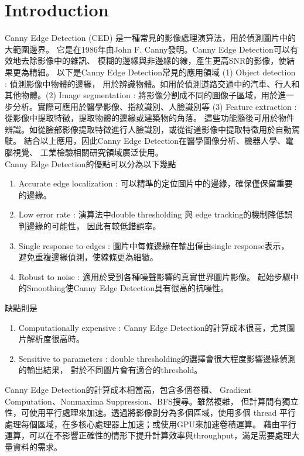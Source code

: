 \documentclass[sigconf,nonacm]{acmart}
\begin{document}
\section{Introduction}
  Canny Edge Detection (CED) 是一種常見的影像處理演算法，用於偵測圖片中的大範圍邊界。
  它是在1986年由John F. Canny發明。Canny Edge Detection可以有效地去除影像中的雜訊、
  模糊的邊緣與非邊緣的線，產生更高SNR的影像，使結果更為精細。
  以下是Canny Edge Detection常見的應用領域 (1) Object detection : 偵測影像中物體的邊緣，
  用於辨識物體。如用於偵測道路交通中的汽車、行人和其他物體。(2) Image segmentation : 
  將影像分割成不同的圖像子區域，用於進一步分析。實際可應用於醫學影像、指紋識別、人臉識別等 
  (3) Feature extraction : 從影像中提取特徵，提取物體的邊緣或建築物的角落。
  這些功能隨後可用於物件辨識。如從臉部影像提取特徵進行人臉識別，或從街道影像中提取特徵用於自動駕駛。
  結合以上應用，因此Canny Edge Detection在醫學圖像分析、機器人學、電腦視覺、
  工業檢驗相關研究領域廣泛使用。 \\
  Canny Edge Detection的優點可以分為以下幾點
  \begin{enumerate}
    \item Accurate edge localization : 可以精準的定位圖片中的邊緣，確保僅保留重要的邊緣。
    \item Low error rate : 演算法中double thresholding 與 edge tracking的機制降低誤判邊緣的可能性，
    因此有較低錯誤率。
    \item Single response to edges : 圖片中每條邊緣在輸出僅由single response表示，
    避免重複邊緣偵測，使線條更為細緻。
    \item Robust to noise : 適用於受到各種噪聲影響的真實世界圖片影像。
    起始步驟中的Smoothing使Canny Edge Detection具有很高的抗噪性。
  \end{enumerate}
  缺點則是
  \begin{enumerate}
    \item Computationally expensive : Canny Edge Detection的計算成本很高，尤其圖片解析度很高時。
    \item Sensitive to parameters : double thresholding的選擇會很大程度影響邊緣偵測的輸出結果，
    對於不同圖片會有適合的threshold。
  \end{enumerate}
  Canny Edge Detection的計算成本相當高，包含多個卷積、
  Gradient Computation、Nonmaxima Suppression、BFS搜尋。雖然複雜，
  但計算間有獨立性，可使用平行處理來加速。透過將影像劃分為多個區域，使用多個 thread
  平行處理每個區域，在多核心處理器上加速；或使用GPU來加速卷積運算。
  藉由平行運算，可以在不影響正確性的情形下提升計算效率與throughput，滿足需要處理大量資料的需求。
\end{document}
